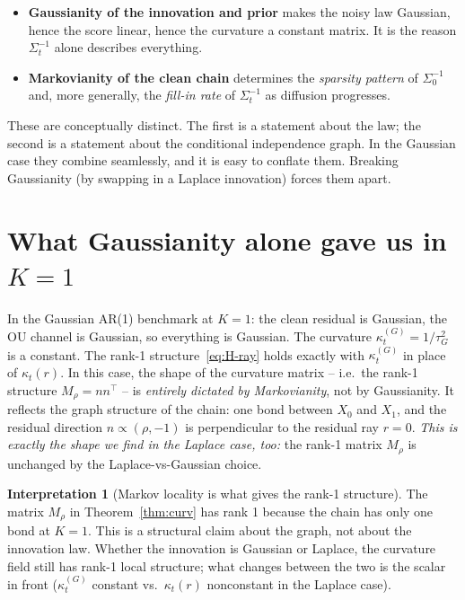 \documentclass[11pt,a4paper,openany]{book}
\theoremstyle{plainserif}
\theoremstyle{definition}
\theoremstyle{remarkstyle}
\newtheorem*{interpretation}{Interpretation}
\begin{document}
\begin{itemize}[leftmargin=2em]
\item \textbf{Gaussianity of the innovation and prior} makes the noisy
law Gaussian, hence the score linear, hence the curvature a constant
matrix. It is the reason $\Sigma_t^{-1}$ alone describes everything.
\item \textbf{Markovianity of the clean chain} determines the
\emph{sparsity pattern} of $\Sigma_0^{-1}$ and, more generally, the
\emph{fill-in rate} of $\Sigma_t^{-1}$ as diffusion progresses.
\end{itemize}

These are conceptually distinct. The first is a statement about the
law; the second is a statement about the conditional independence graph.
In the Gaussian case they combine seamlessly, and it is easy to conflate
them. Breaking Gaussianity (by swapping in a Laplace innovation) forces
them apart.

\section{What Gaussianity alone gave us in $K{=}1$}

In the Gaussian AR(1) benchmark at $K=1$: the clean residual is Gaussian,
the OU channel is Gaussian, so everything is Gaussian. The curvature
$\kappa_t^{(G)} = 1/\tau_G^2$ is a constant. The rank-1 structure~\eqref{eq:H-ray}
holds exactly with $\kappa_t^{(G)}$ in place of $\kappa_t(r)$. In this
case, the shape of the curvature matrix -- i.e.\ the rank-1 structure
$M_\rho = nn^\top$ -- is \emph{entirely dictated by Markovianity}, not by
Gaussianity. It reflects the graph structure of the chain: one bond
between $X_0$ and $X_1$, and the residual direction $n \propto (\rho, -1)$
is perpendicular to the residual ray $r = 0$. \emph{This is exactly the
shape we find in the Laplace case, too:} the rank-1 matrix $M_\rho$ is
unchanged by the Laplace-vs-Gaussian choice.

\begin{interpretation}[Markov locality is what gives the rank-1 structure]
The matrix $M_\rho$ in Theorem~\ref{thm:curv} has rank 1 because the chain
has only one bond at $K=1$. This is a structural claim about the graph,
not about the innovation law. Whether the innovation is Gaussian or
Laplace, the curvature field still has rank-1 local structure; what
changes between the two is the scalar in front ($\kappa_t^{(G)}$ constant
vs.\ $\kappa_t(r)$ nonconstant in the Laplace case).
\end{interpretation}
\end{document}
